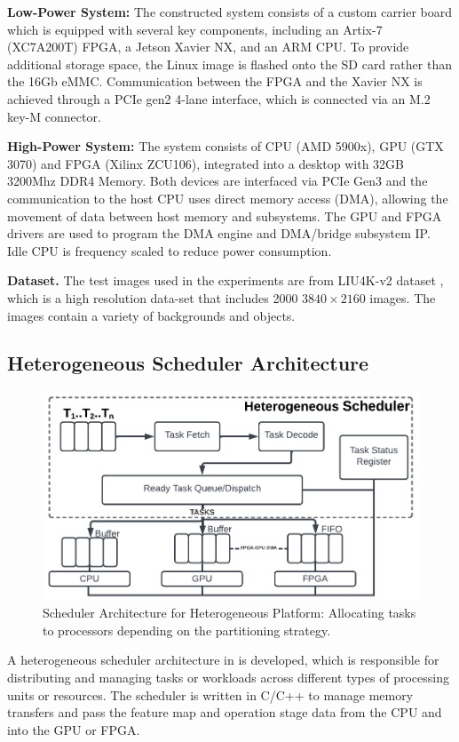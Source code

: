 \textbf{Low-Power System:}
The constructed system consists of a custom carrier board which is equipped with several key components, including an Artix-7 (XC7A200T) FPGA, a Jetson Xavier NX, and an ARM CPU. To provide additional storage space, the Linux image is flashed onto the SD card rather than the 16Gb eMMC. Communication between the FPGA and the Xavier NX is achieved through a PCIe gen2 4-lane interface, which is connected via an M.2 key-M connector.  

\textbf{High-Power System:}
The system consists of  CPU (AMD 5900x), GPU (GTX 3070) and FPGA (Xilinx ZCU106), integrated into a desktop with 32GB 3200Mhz DDR4 Memory. Both devices are interfaced via PCIe Gen3 and the communication to the host CPU uses direct memory access (DMA), allowing the movement of data between host memory and subsystems. The GPU and FPGA drivers are used to program the DMA engine and DMA/bridge subsystem IP. Idle CPU is frequency scaled to reduce power consumption. 

\textbf{Dataset.} The test images used in the experiments are from LIU4K-v2 dataset \cite{LiuliuYan19}, which is a high resolution data-set that includes 2000 $3840\times2160$ images. The images contain a variety of backgrounds and objects. 

\subsection*{Heterogeneous Scheduler Architecture}
\begin{figure}[tb]
\centering
 \includegraphics[width=\columnwidth]{Images/SchedulerDetail.png}
   \caption[Scheduler Architecture]{Scheduler Architecture for Heterogeneous Platform: Allocating tasks to processors depending on the partitioning strategy.}
   \label{fig:SchedulerArch}
\end{figure}
A heterogeneous scheduler architecture in  is developed, which is responsible for distributing and managing tasks or workloads across different types of processing units or resources. The scheduler is written in C/C++ to manage memory transfers and pass the feature map and operation stage data from the CPU and into the GPU or FPGA.


